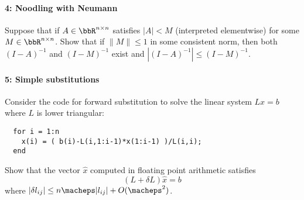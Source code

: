 \documentclass[12pt, leqno]{article} %
\begin{document}
\paragraph*{4: Noodling with Neumann}
Suppose that if $A \in \bbR^{n \times n}$ satisfies
$|A| < M$ (interpreted elementwise) for some $M \in \bbR^{n \times n}$.
Show that if $\|M\| \leq 1$ in some consistent norm, then
both $(I-A)^{-1}$ and $(I-M)^{-1}$ exist and
$|(I-A)^{-1}| \leq (I-M)^{-1}$.

\paragraph*{5: Simple substitutions}
Consider the code for forward substitution to solve the linear system
$Lx = b$ where $L$ is lower triangular:
\begin{lstlisting}
  for i = 1:n
    x(i) = ( b(i)-L(i,1:i-1)*x(1:i-1) )/L(i,i);
  end
\end{lstlisting}
Show that the vector $\hat{x}$ computed in floating point arithmetic
satisfies
\[
  (L+\delta L) \hat{x} = b
\]
where $|\delta l_{ij}| \leq n \macheps |l_{ij}| + O(\macheps^2)$.
\end{document}
